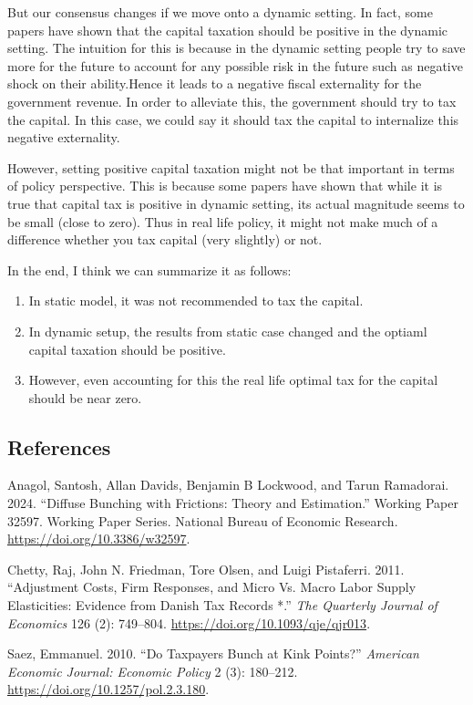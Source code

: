 \documentclass[
  letterpaper,
  DIV=11,
  numbers=noendperiod]{scrartcl}
\newlength{\cslhangindent}
\newenvironment{CSLReferences}[2] %
 {\begin{list}{}{%
  \setlength{\itemindent}{0pt}
  \setlength{\leftmargin}{0pt}
  \setlength{\parsep}{0pt}
  \ifodd #1
   \setlength{\leftmargin}{\cslhangindent}
   \setlength{\itemindent}{-1\cslhangindent}
  \fi
  \setlength{\itemsep}{#2\baselineskip}}}
 {\end{list}}
\begin{document}
But our consensus changes if we move onto a dynamic setting. In fact,
some papers have shown that the capital taxation should be positive in
the dynamic setting. The intuition for this is because in the dynamic
setting people try to save more for the future to account for any
possible risk in the future such as negative shock on their
ability.Hence it leads to a negative fiscal externality for the
government revenue. In order to alleviate this, the government should
try to tax the capital. In this case, we could say it should tax the
capital to internalize this negative externality.

However, setting positive capital taxation might not be that important
in terms of policy perspective. This is because some papers have shown
that while it is true that capital tax is positive in dynamic setting,
its actual magnitude seems to be small (close to zero). Thus in real
life policy, it might not make much of a difference whether you tax
capital (very slightly) or not.

In the end, I think we can summarize it as follows:

\begin{enumerate}
\def\labelenumi{\arabic{enumi}.}
\item
  In static model, it was not recommended to tax the capital.
\item
  In dynamic setup, the results from static case changed and the optiaml
  capital taxation should be positive.
\item
  However, even accounting for this the real life optimal tax for the
  capital should be near zero.
\end{enumerate}

\subsection*{References}\label{references}

\label{refs}
\begin{CSLReferences}{1}{0}
Anagol, Santosh, Allan Davids, Benjamin B Lockwood, and Tarun Ramadorai.
2024. {``Diffuse Bunching with Frictions: Theory and Estimation.''}
Working Paper 32597. Working Paper Series. National Bureau of Economic
Research. \url{https://doi.org/10.3386/w32597}.

Chetty, Raj, John N. Friedman, Tore Olsen, and Luigi Pistaferri. 2011.
{``Adjustment Costs, Firm Responses, and Micro Vs. Macro Labor Supply
Elasticities: Evidence from Danish Tax Records *.''} \emph{The Quarterly
Journal of Economics} 126 (2): 749--804.
\url{https://doi.org/10.1093/qje/qjr013}.

Saez, Emmanuel. 2010. {``Do Taxpayers Bunch at Kink Points?''}
\emph{American Economic Journal: Economic Policy} 2 (3): 180--212.
\url{https://doi.org/10.1257/pol.2.3.180}.

\end{CSLReferences}
\end{document}
